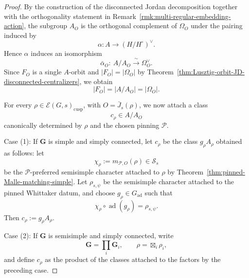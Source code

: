\documentclass{amsart}
\theoremstyle{plain}
\numberwithin{equation}{section}
\theoremstyle{definition}
\newcommand{\cP}{\mathcal{P}}
\newcommand{\cE}{\mathcal{E}}
\newcommand{\ad}{\operatorname{ad}}
\newcommand{\cusp}{\operatorname{cusp}}
\newcommand{\bG}{\mathbf{G}}
\begin{document}
\begin{proof}
By the construction of the disconnected Jordan decomposition together with the orthogonality
statement in Remark~\ref{rmk:multi-regular-embedding-action}, the subgroup \(A_O\) is the orthogonal complement of
\(\Omega_O\) under the pairing induced by
\[
\alpha:A\longrightarrow (H/H^\circ)^\vee.
\]
Hence \(\alpha\) induces an isomorphism
\begin{equation}\label{eq:alpha-fiber-iso-rewrite}
\bar\alpha_O:\ A/A_O \xrightarrow{\ \sim\ } \Omega_O^\vee.
\end{equation}
Since \(F_O\) is a single \(A\)-orbit and \(|F_O|=|\Omega_O|\) by
Theorem~\ref{thm:Lusztig-orbit-JD-disconnected-centralizers}, we obtain
\begin{equation}\label{eq:FO-size-rewrite}
|F_O|=|A/A_O|=|\Omega_O|.
\end{equation}

For every \(\rho\in \cE(G,s)_{\cusp}\), with \(O=\bar J_s(\rho)\), we now attach a class
\[
c_\rho\in A/A_O
\]
canonically determined by \(\rho\) and the chosen pinning \(\cP\).

Case (1): If \(\bG\) is simple and simply connected, let \(c_\rho\) be the class \(g_\rho A_\rho\) obtained
as follows: let
\[
        \chi_\rho:=m_{\cP,O}(\rho)\in \mathcal S_s
\]
be the \(\cP\)-preferred semisimple character attached to \(\rho\) by
Theorem~\ref{thm:pinned-Malle-matching-simple}. Let \(\rho_{s,\psi}\) be the semisimple character attached to the pinned Whittaker datum, and choose
\(g_\rho\in G_{\ad}\) such that
\[
\chi_\rho\circ \ad(g_\rho)=\rho_{s,\psi}.
\]
Then \(c_\rho:=g_\rho A_\rho\).

Case (2): If \(\bG\) is semisimple and simply connected, write
\[
\bG=\prod_i \bG_i,\qquad \rho=\boxtimes_i \rho_i,
\]
and define \(c_\rho\) as the product of the classes attached to the factors by the preceding case.


\end{proof}
\end{document}
